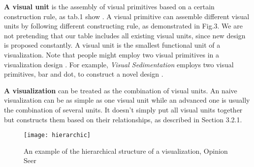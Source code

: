 \textbf{A visual unit} is the assembly of visual primitives based on a certain construction rule, as tab.1 show . 
A visual primitive can assemble different visual units by following different constructing rule, as demonstrated in Fig.3.  We are not pretending that our table includes all existing visual units, since new design is proposed constantly. A visual unit is the smallest functional unit of a visualization. Note that people might employ two visual primitives in a visualization design . For example, \textit{Visual Sedimentation}\cite{huron_visual_2013}  employs two visual primitives, bar and dot, to construct a novel design . 


\textbf{A visualization} can be treated as the combination of visual units. An naive visualization can be as simple as one visual unit while an advanced one is usually the combination of several units. It doesn't simply put all visual units together but constructs them based on their relationships, as described in Section 3.2.1.

\begin{figure}
 \centering %
 \texttt{[image: hierarchic]}
 \caption{An example of the hierarchical structure of a visualization, Opinion Seer\cite{wu_opinionseer:_2010}}
 \label{fig:hierarchic}
\end{figure}


